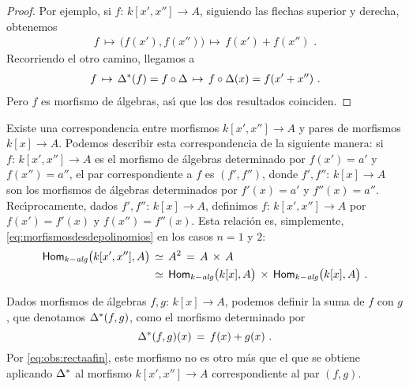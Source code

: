 \begin{proof}
	Por ejemplo, si $f:\,k[x',x'']\rightarrow A$, siguiendo las flechas
	superior y derecha, obtenemos
	\begin{align*}
		f\,\mapsto\,\big(f(x'),f(x'')\big)\,\mapsto\,f(x')+f(x'')
		\text{ .}
	\end{align*}
	Recorriendo el otro camino, llegamos a
	\begin{align*}
		f\,\mapsto\,{\Delta}^{*}(f)=f\circ\Delta\,\mapsto\,
			f\circ\Delta(x)=f(x'+x'')
		\text{ .}
	\end{align*}
	Pero $f$ es morfismo de \'{a}lgebras, as\'{\i} que los dos resultados
	coinciden.
\end{proof}

\begin{obsRectaAfin}\label{obs:rectaafin}
	Existe una correspondencia entre morfismos $k[x',x'']\rightarrow A$ y
	pares de morfismos $k[x]\rightarrow A$. Podemos describir esta
	correspondencia de la siguiente manera: si $f:\,k[x',x'']\rightarrow A$
	es el morfismo de \'{a}lgebras determinado por $f(x')=a'$ y
	$f(x'')=a''$, el par correspondiente a $f$ es $(f',f'')$, donde
	$f',f'':\,k[x]\rightarrow A$ son los morfismos de \'{a}lgebras
	determinados por $f'(x)=a'$ y $f''(x)=a''$. Rec\'{\i}procamente, dados
	$f',f'':\,k[x]\rightarrow A$, definimos $f:\,k[x',x'']\rightarrow A$
	por $f(x')=f'(x)$ y $f(x'')=f''(x)$. Esta relaci\'{o}n es, simplemente,
	\eqref{eq:morfismosdesdepolinomios} en los casos $n=1$ y $2$:
	\begin{equation}
		\label{eq:obs:rectaafin}
		\begin{aligned}
			\mathsf{Hom}_{k-\mathit{alg}}\big(k[x',x''],A\big) & \,\simeq\, A^2\,=\,
				A\,\times\,A \\
			& \,\simeq\,\mathsf{Hom}_{k-\mathit{alg}}\big(k[x],A\big)\,\times\,
				\mathsf{Hom}_{k-\mathit{alg}}\big(k[x],A\big)
			\text{ .}
		\end{aligned}
	\end{equation}
\end{obsRectaAfin}

Dados morfismos de \'{a}lgebras $f,g:\,k[x]\rightarrow A$, podemos definir la
suma de $f$ con $g$, que denotamos ${\Delta}^{*}(f,g)$, como el morfismo
determinado por
\begin{equation}
	\label{eq:rectaafin:suma}
	{\Delta}^{*}(f,g)(x) \,=\,f(x)+g(x)
	\text{ .}
\end{equation}
%
Por \eqref{eq:obs:rectaafin}, este morfismo no es otro m\'{a}s que el que se
obtiene aplicando ${\Delta}^{*}$ al morfismo $k[x',x'']\rightarrow A$
correspondiente al par $(f,g)$.

